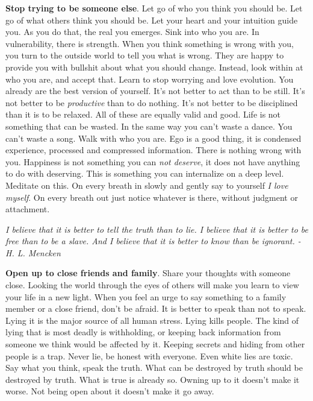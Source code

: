 \documentclass[a4paper,hidelinks]{article}
\begin{document}
\textbf{Stop trying to be someone else}.
Let go of who you think you should be.
Let go of what others think you should be.
Let your heart and your intuition guide you.
As you do that, the real you emerges.
Sink into who you are.
In vulnerability, there is strength.
When you think something is wrong with you, you turn to the outside world to tell you what is wrong.
They are happy to provide you with bullshit about what you should change.
Instead, look within at who you are, and accept that.
Learn to stop worrying and love evolution.
You already are the best version of yourself.
It's not better to act than to be still.
It's not better to be \textit{productive} than to do nothing.
It's not better to be disciplined than it is to be relaxed.
All of these are equally valid and good.
Life is not something that can be wasted.
In the same way you can't waste a dance.
You can't waste a song.
Walk with who you are.
Ego is a good thing, it is condensed experience, processed and compressed information.
There is nothing wrong with you.
Happiness is not something you can \textit{not deserve}, it does not have anything to do with deserving.
This is something you can internalize on a deep level.
Meditate on this.
On every breath in slowly and gently say to yourself \textit{I love myself}.
On every breath out just notice whatever is there, without judgment or attachment.

\newpage

\begin{center}
\textit{I believe that it is better to tell the truth than to lie. I believe that it is better to be free than to be a slave. And I believe that it is better to know than be ignorant. - H. L. Mencken}
\end{center}

\textbf{Open up to close friends and family}.
Share your thoughts with someone close.
Looking the world through the eyes of others will make you learn to view your life in a new light.
When you feel an urge to say something to a family member or a close friend, don't be afraid.
It is better to speak than not to speak.
Lying it is the major source of all human stress.
Lying kills people.
The kind of lying that is most deadly is withholding, or keeping back information from someone we think would be affected by it.
Keeping secrets and hiding from other people is a trap.
Never lie, be honest with everyone.
Even white lies are toxic.
Say what you think, speak the truth.
What can be destroyed by truth should be destroyed by truth.
What is true is already so.
Owning up to it doesn't make it worse.
Not being open about it doesn't make it go away.
\end{document}
